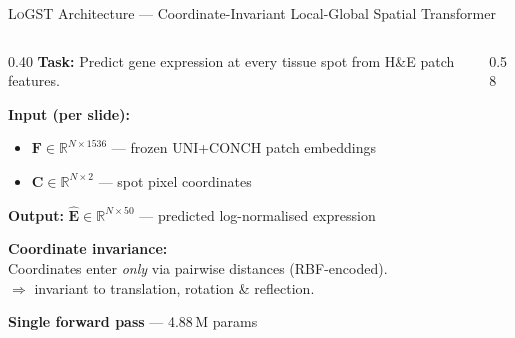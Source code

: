 \documentclass[aspectratio=169,12pt]{beamer}
\newcommand{\morph}{\textsc{LoGST}}
\begin{document}
\begin{frame}[shrink=18]{\morph{} Architecture — Coordinate-Invariant Local-Global Spatial Transformer}

\begin{columns}[T]

\begin{column}{0.40\textwidth}
\small
\textbf{Task:} Predict gene expression at every tissue spot from H\&E patch features.

\medskip
\textbf{Input (per slide):}
\begin{itemize}
  \item $\mathbf{F}\in\mathbb{R}^{N\times1536}$ — frozen UNI+CONCH patch embeddings
  \item $\mathbf{C}\in\mathbb{R}^{N\times2}$ — spot pixel coordinates
\end{itemize}

\medskip
\textbf{Output:}
$\hat{\mathbf{E}}\in\mathbb{R}^{N\times50}$ — predicted log-normalised expression

\medskip
\textbf{Coordinate invariance:}\\
Coordinates enter \emph{only} via pairwise distances (RBF-encoded).\\
$\Rightarrow$ invariant to translation, rotation \& reflection.

\medskip
\textbf{Single forward pass} — 4.88\,M params
\end{column}

\begin{column}{0.58\textwidth}
\end{column}
\end{columns}
\end{frame}
\end{document}
